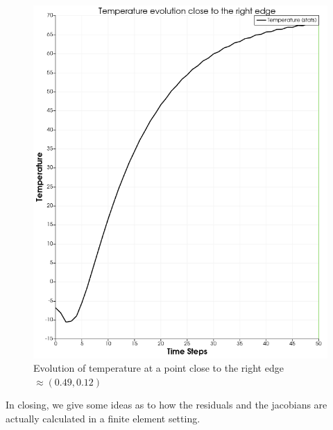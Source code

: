 \documentclass[preprint,12pt]{elsarticle}
\numberwithin{equation}{section}
\begin{document}
\begin{figure}[H]
	\begin{center}	
		\includegraphics[scale=0.3]{./Images/Temp_evol.png}
		\caption{Evolution of temperature at a point close to the right edge $\approx (0.49, 0.12)$ \label{tempevol}}
	\end{center}
\end{figure}

In closing, we give some ideas as to how the residuals and the jacobians are actually calculated in a finite element setting. 
\end{document}
